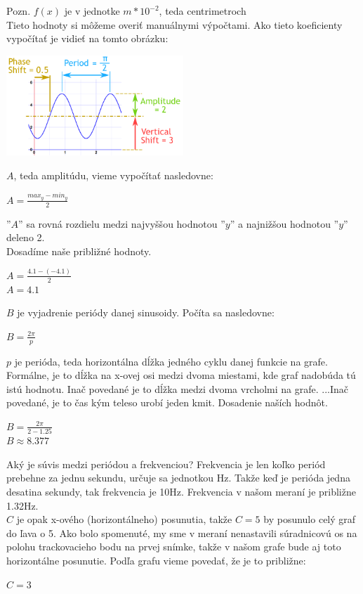 \documentclass[11pt]{extarticle}
\begin{document}
Pozn. $f(x)$ je v jednotke $m*10^{-2}$, teda centrimetroch\\[2em]

Tieto hodnoty si môžeme overiť manuálnymi výpočtami. Ako tieto koeficienty vypočítať je vidieť na tomto obrázku:\\
\begin{center}
	\includegraphics[width=0.5\textwidth]{fitovanie_sin}
\end{center}


$A$, teda amplitúdu, vieme vypočítať nasledovne:
\begin{center}
$A = \frac{max_y - min_y}{2}$
\end{center}
''$A$'' sa rovná rozdielu medzi najvyššou hodnotou ''$y$'' a najnižšou hodnotou ''$y$'' deleno 2.\\
Dosadíme naše približné hodnoty.
\begin{center}
$A = \frac{4.1 - (-4.1)}{2}$\\
$A = 4.1$
\end{center}

$B$ je vyjadrenie periódy danej sinusoidy. Počíta sa nasledovne:
\begin{center}$B = \frac{2\pi}{p}$\end{center}
$p$ je perióda, teda horizontálna dĺžka jedného cyklu danej funkcie na grafe. Formálne, je to dĺžka na x-ovej osi medzi dvoma miestami, kde graf nadobúda tú istú hodnotu. Inač povedané je to dĺžka medzi dvoma vrcholmi na grafe. ...Inač povedané, je to čas kým teleso urobí jeden kmit.
Dosadenie naších hodnôt.
\begin{center}
$B = \frac{2\pi}{2 - 1.25}$\\
$B \approx 8.377$
\end{center}
Aký je súvis medzi periódou a frekvenciou? Frekvencia je len koľko periód prebehne za jednu sekundu, určuje sa jednotkou Hz. Takže keď je perióda jedna desatina sekundy, tak frekvencia je 10Hz. Frekvencia v našom meraní je približne 1.32Hz.
\\[2em]

$C$ je opak x-ového (horizontálneho) posunutia, takže $C = 5$ by posunulo celý graf do ľava o 5.
Ako bolo spomenuté, my sme v meraní nenastavili súradnicovú os na polohu trackovacieho bodu na prvej snímke, takže v našom grafe bude aj toto horizontálne posunutie. Podľa grafu vieme povedať, že je to približne:
\begin{center}
$C = 3$
\end{center}
\end{document}
